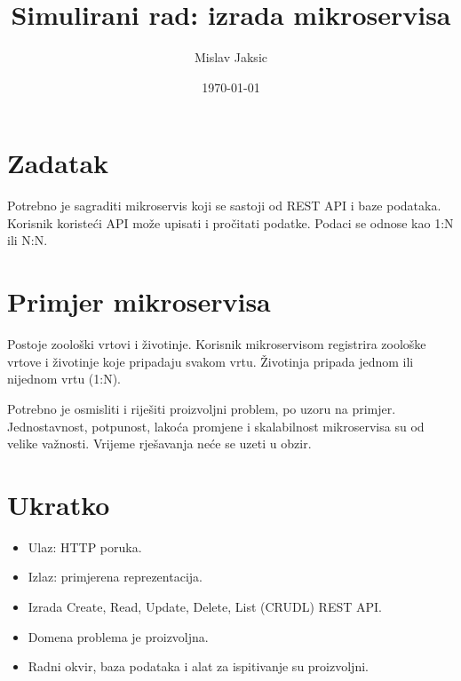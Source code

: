 \documentclass{article}
\title{Simulirani rad: izrada mikroservisa}
\author{Mislav Jaksic}
\date{\today}
\begin{document}
\maketitle

\section{Zadatak}

Potrebno je sagraditi mikroservis koji se sastoji od REST API i baze podataka. Korisnik koristeći API može upisati i pročitati podatke. Podaci se odnose kao 1:N ili N:N.

\section{Primjer mikroservisa}

Postoje zoološki vrtovi i životinje. Korisnik mikroservisom registrira zoološke vrtove i životinje koje pripadaju svakom vrtu. Životinja pripada jednom ili nijednom vrtu (1:N).

Potrebno je osmisliti i riješiti proizvoljni problem, po uzoru na primjer. Jednostavnost, potpunost, lakoća promjene i skalabilnost mikroservisa su od velike važnosti. Vrijeme rješavanja neće se uzeti u obzir.

\section{Ukratko}

\begin{itemize}
  \item Ulaz: HTTP poruka.
  \item Izlaz: primjerena reprezentacija.
  \item Izrada Create, Read, Update, Delete, List (CRUDL) REST API.
  \item Domena problema je proizvoljna.
  \item Radni okvir, baza podataka i alat za ispitivanje su proizvoljni.
\end{itemize}
\end{document}
